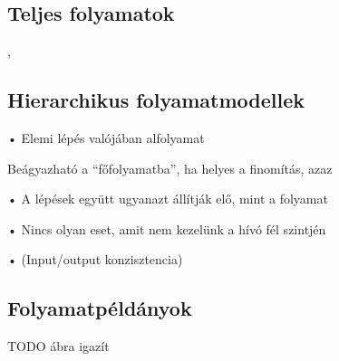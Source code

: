 \subsection{Teljes folyamatok}


\begin{definicio}
	, 
\end{definicio}


\subsection{Hierarchikus folyamatmodellek}

\begin{definicio}
\end{definicio}

• Elemi lépés valójában alfolyamat



\begin{definicio}
\end{definicio}




Beágyazható a “főfolyamatba”, ha helyes a finomítás, azaz

• A lépések együtt ugyanazt állítják elő, mint a folyamat

• Nincs olyan eset, amit nem kezelünk a hívó fél szintjén

• (Input/output konzisztencia)


\subsection{Folyamatpéldányok}
TODO ábra igazít

